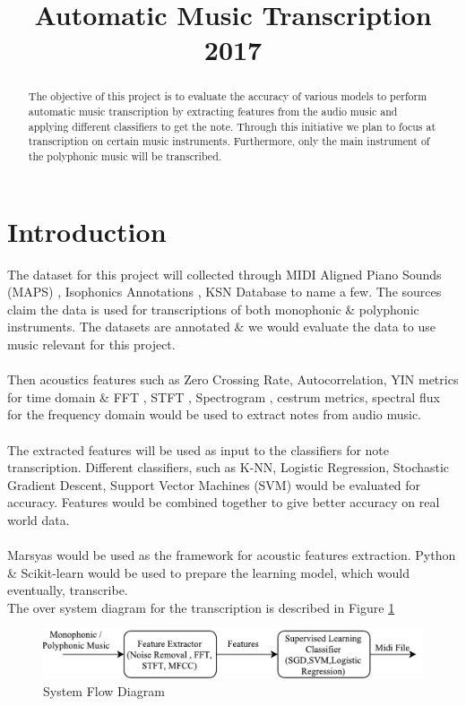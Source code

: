 \documentclass{article}
\title{Automatic Music Transcription 2017}
\begin{document}
%
\maketitle
%
\begin{abstract}
The objective of this project is to evaluate the accuracy of various models to perform automatic music transcription by extracting features from the audio music and applying different classifiers to get the note. Through this initiative we plan to focus at transcription on certain music instruments. Furthermore, only the main instrument of the polyphonic music will be transcribed.
\end{abstract}
%
\section{Introduction}\label{sec:introduction}
The dataset for this project will collected through MIDI Aligned Piano Sounds (MAPS) , Isophonics Annotations , KSN Database to name a few. The sources claim the data is used for transcriptions of both monophonic \& polyphonic instruments. The datasets are annotated \& we would evaluate the data to use music relevant for this project.  \\\\
Then acoustics features such as Zero Crossing Rate, Autocorrelation, YIN metrics for time domain \& FFT , STFT , Spectrogram , cestrum metrics, spectral flux for the frequency domain would be used to extract notes from audio music. \\\\
The extracted features will be used as input to the classifiers for note transcription. Different classifiers, such as K-NN, Logistic Regression, Stochastic Gradient Descent, Support Vector Machines (SVM) would be evaluated for accuracy. Features would be combined together to give better accuracy on real world data.\\
\\
Marsyas would be used as the framework for acoustic features extraction. Python \& Scikit-learn would be used to prepare the learning model, which would eventually, transcribe. \\

The over system diagram for the transcription is described in Figure \ref{figure1}

\begin{figure}[h]
\includegraphics[scale=.55]{System_Flow_Diagram}
 \caption{System Flow Diagram}
\label{figure1}
\end{figure}
\end{document}

